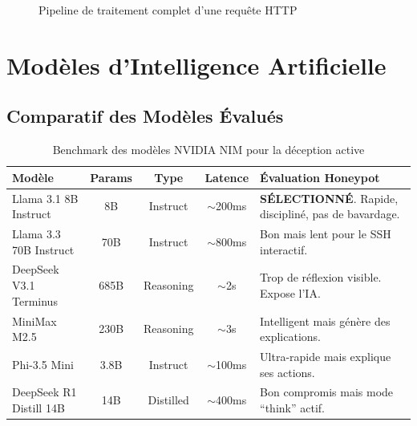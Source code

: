 \documentclass[12pt,a4paper]{article}
\begin{document}
\begin{figure}[h!]
\caption{Pipeline de traitement complet d'une requête HTTP}
\end{figure}

\section{Modèles d'Intelligence Artificielle}

\subsection{Comparatif des Modèles Évalués}

\begin{table}[h!]
\centering
\small
\begin{tabularx}{\textwidth}{l c c c X}
\toprule
\textbf{Modèle} & \textbf{Params} & \textbf{Type} & \textbf{Latence} & \textbf{Évaluation Honeypot} \\
\midrule
Llama 3.1 8B Instruct & 8B & Instruct & $\sim$200ms & \textcolor{ghostgreen}{\textbf{SÉLECTIONNÉ}}. Rapide, discipliné, pas de bavardage. \\
Llama 3.3 70B Instruct & 70B & Instruct & $\sim$800ms & Bon mais lent pour le SSH interactif. \\
DeepSeek V3.1 Terminus & 685B & Reasoning & $\sim$2s & Trop de réflexion visible. Expose l'IA. \\
MiniMax M2.5 & 230B & Reasoning & $\sim$3s & Intelligent mais génère des explications. \\
Phi-3.5 Mini & 3.8B & Instruct & $\sim$100ms & Ultra-rapide mais explique ses actions. \\
DeepSeek R1 Distill 14B & 14B & Distilled & $\sim$400ms & Bon compromis mais mode ``think'' actif. \\
\bottomrule
\end{tabularx}
\caption{Benchmark des modèles NVIDIA NIM pour la déception active}
\end{table}
\end{document}
